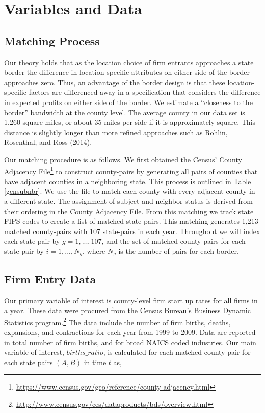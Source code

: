 \documentclass[12pt,a4paper]{article}
\begin{document}
\section{Variables and Data}

\subsection{Matching Process}

Our theory holds that as the location choice of firm entrants approaches a state border the  difference in location-specific attributes on either side of the border approaches zero.  Thus, an advantage of the border design is that these location-specific factors are differenced away in a specification that considers the difference in expected profits on either side of the border.  We estimate a “closeness to the border” bandwidth at the county level. The average county in our data set is 1,260 square miles, or about 35 miles per side if it is approximately square. This distance is slightly longer than more refined approaches such as Rohlin, Rosenthal, and Ross (2014). 

Our matching procedure is as follows. We first obtained the Census' County Adjacency File\footnote{\url{https://www.census.gov/geo/reference/county-adjacency.html}} to construct county-pairs by generating all pairs of counties that have adjacent counties in a neighboring state. This process is outlined in Table \ref{gensubnbr}. We use the file to match each county with every adjacent county in a different state. The assignment of subject and neighbor status is derived from their ordering in the County Adjacency File. From this matching we track state FIPS codes to create a list of matched state pairs. This matching generates 1,213 matched county-pairs with 107 state-pairs in each year. Throughout we will index each state-pair by $g = 1,...,107$, and the set of matched county pairs for each state-pair by $i = 1,...,N_{g}$, where $N_g$ is the number of pairs for each border.


\subsection{Firm Entry Data}

Our primary variable of interest is county-level firm start up rates for all firms in a year. These data were procured from the Census Bureau’s Business Dynamic Statistics program.\footnote{\url{http://www.census.gov/ces/dataproducts/bds/overview.html}} The data include the number of firm births, deaths, expansions, and contractions for each year from 1999 to 2009. Data are reported in total number of firm births, and for broad NAICS coded industries. Our main variable of interest, $births\_ratio$, is calculated for each matched county-pair for each state pairs $(A, B)$ in time $t$ as, 
\end{document}
